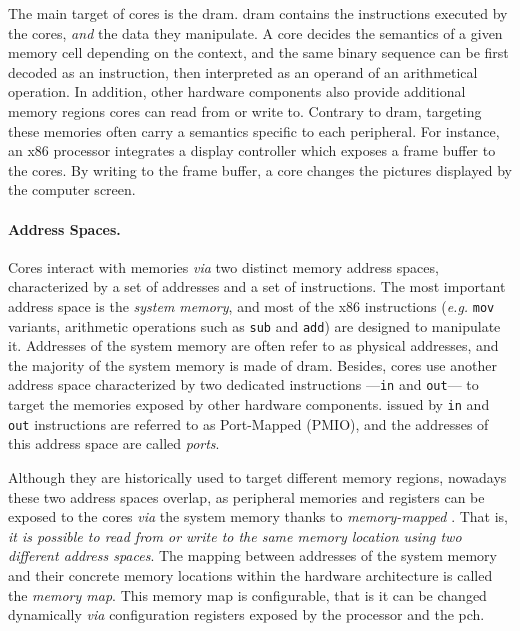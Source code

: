 The main target of cores \IOs is the \ac{dram}.
%
\ac{dram} contains the instructions executed by the cores, \emph{and} the data
they manipulate.
%
A core decides the semantics of a given memory cell depending on the context,
and the same binary sequence can be first decoded as an instruction, then
interpreted as an operand of an arithmetical operation. 
%
In addition, other hardware components also provide additional memory regions
cores can read from or write to.
%
Contrary to \ac{dram}, \IOs targeting these memories often carry a semantics
specific to each peripheral.
%
For instance, an x86 processor integrates a display controller which exposes a
frame buffer to the cores.
%
By writing to the frame buffer, a core changes the pictures displayed by the
computer screen.

\paragraph{Address Spaces.}
%
Cores interact with memories \emph{via} two distinct memory address spaces,
characterized by a set of addresses and a set of instructions.
%
The most important address space is the \emph{system memory}, and most of the
x86 instructions (\emph{e.g.} \texttt{mov} variants, arithmetic operations such
as \texttt{sub} and \texttt{add}) are designed to manipulate it.
%
Addresses of the system memory are often refer to  as physical addresses, and the
majority of the system memory is made of \ac{dram}. 
%
Besides, cores use another address space characterized by two dedicated
instructions ---\texttt{in} and \texttt{out}--- to target the memories exposed
by other hardware components.
%
\IOs issued by \texttt{in} and \texttt{out} instructions are referred to as
Port-Mapped \IOs (PMIO), and the addresses of this address space are called
\emph{ports}.

Although they are historically used to target different memory regions, nowadays
these two address spaces overlap, as peripheral memories and registers can be
exposed to the cores \emph{via} the system memory thanks to \emph{memory-mapped}
\IOs.
%
That is, \emph{it is possible to read from or write to the same memory location
  using two different address spaces}.
%
%
%
The mapping between addresses of the system memory and their concrete memory
locations within the hardware architecture is called the \emph{memory map}.
%
This memory map is configurable, that is it can be changed dynamically \emph{via}
configuration registers exposed by the processor and the \ac{pch}.

